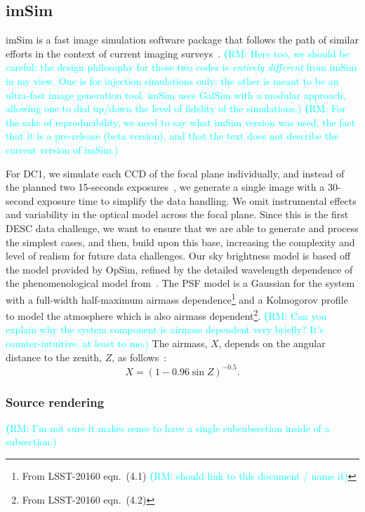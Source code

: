 \documentclass[twocolumn]{aastex62}
\newcommand{\rachel}[1]{{\textcolor{cyan}{{\textbf (RM: #1)}}}}
\begin{document}
\subsection{imSim}
\label{sec:imsim_pipeline}

imSim is a fast image simulation software package that follows the path of similar efforts in the context of current imaging surveys~\citet{2016MNRAS.457..786S,2016ApJ...817...25B}.  \rachel{Here too, we should be careful: the design philosophy for those two codes is {\em entirely different} from imSim in my view.  One is for injection simulations only; the other is meant to be an ultra-fast image generation tool.  imSim uses GalSim with a modular approach, allowing one to dial up/down the level of fidelity of the simulations.} \rachel{For the sake of reproducibility, we need to say what imSim version was used, the fact that it is a pre-release (beta version), and that the text does not describe the current version of imSim.}

For DC1, we simulate each CCD of the focal plane individually, and instead of the planned two 15-seconds exposures~\citep{Overview}, we generate a single image with a 30-second exposure time to simplify the data handling. We omit instrumental effects and variability in the optical model across the focal plane. Since this is the first DESC data challenge, we want to ensure that we are able to generate and process the simplest cases, and then, build upon this base, increasing the complexity and level of realism for future data challenges. Our sky brightness model is based off the \citet{1991PASP..103.1033K} model provided by OpSim, refined by the detailed wavelength dependence of the phenomenological model from~\citet{2016SPIE.9910E..1AY}. The PSF model is a Gaussian for the system with a full-width half-maximum airmass dependence\footnote{From LSST-20160 eqn.~(4.1) \rachel{should link to this document / name it}} and a Kolmogorov profile to model the atmosphere which is also airmass dependent\footnote{From LSST-20160 eqn.~(4.2)}. \rachel{Can you explain why the system component is airmass dependent very briefly?  It's counter-intuitive, at least to me.} The airmass, $X$, depends on the angular distance to the zenith, $Z$, as follows~\citep{1991PASP..103.1033K}:
\begin{equation}
X = (1 - 0.96\sin{Z})^{-0.5}.
\end{equation}

\subsubsection{Source rendering}
\rachel{I'm not sure it makes sense to have a single subsubsection inside of a subsection.}
\end{document}
